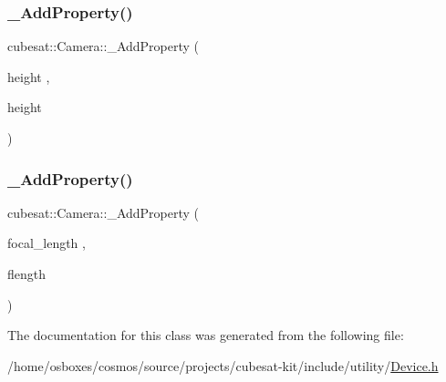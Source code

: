 \mbox{\label{classcubesat_1_1Camera_aeed37c12ee4119bf54fc7124fba19b97}} 
\subsubsection{\texorpdfstring{\+\_\+\+Add\+Property()}{\_AddProperty()}\hspace{0.1cm}{\footnotesize\ttfamily [10/11]}}
{\footnotesize\ttfamily cubesat\+::\+Camera\+::\+\_\+\+Add\+Property (\begin{DoxyParamCaption}\item[{height}]{,  }\item[{height}]{ }\end{DoxyParamCaption})}

\mbox{\label{classcubesat_1_1Camera_a136f46ab3e38b076adba6c4d718a80ab}} 
\subsubsection{\texorpdfstring{\+\_\+\+Add\+Property()}{\_AddProperty()}\hspace{0.1cm}{\footnotesize\ttfamily [11/11]}}
{\footnotesize\ttfamily cubesat\+::\+Camera\+::\+\_\+\+Add\+Property (\begin{DoxyParamCaption}\item[{focal\+\_\+length}]{,  }\item[{flength}]{ }\end{DoxyParamCaption})}



The documentation for this class was generated from the following file\+:\begin{DoxyCompactItemize}
\item 
/home/osboxes/cosmos/source/projects/cubesat-\/kit/include/utility/\hyperlink{Device_8h}{Device.\+h}\end{DoxyCompactItemize}
